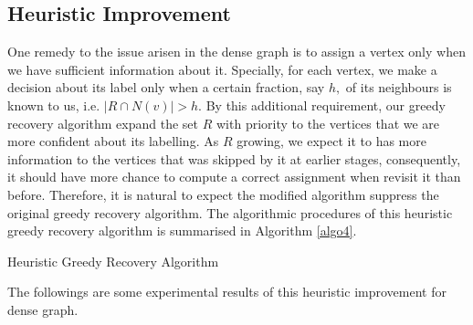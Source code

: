 \subsection{Heuristic Improvement}
One remedy to the issue arisen in the dense graph is to assign a vertex only when we have sufficient information about it. Specially, for each vertex,  we make a decision about its label only when a certain fraction, say $h,$  of its neighbours is known to us, i.e. $|R\cap N(v)|>h.$ By this additional requirement, our greedy recovery algorithm expand the set $R$ with priority to the vertices that we are more confident about its labelling. As $R$ growing, we expect it to has more information to the vertices that was skipped by it at earlier stages, consequently, it should have more chance to compute a correct assignment when revisit it than before. Therefore, it is natural to expect the modified algorithm suppress the original greedy recovery algorithm. The algorithmic procedures of this heuristic greedy recovery algorithm is summarised in Algorithm \ref{algo4}.\\
\clearpage
\begin{algorithm}[ht]

\BlankLine
\caption{Heuristic Greedy Recovery Algorithm}
\label{algo4}
\end{algorithm}
The followings are some experimental results of this heuristic improvement for dense graph. 
